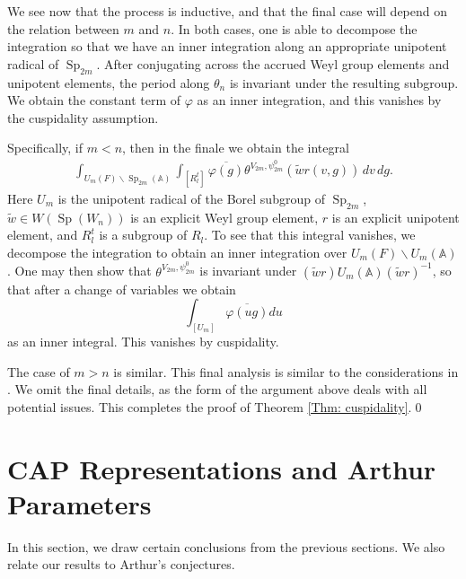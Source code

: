 \documentclass[11pt,reqno]{amsart}
\theoremstyle{definition}
\theoremstyle{remark}
\theoremstyle{definition}
\begin{document}
 We see now that the process is inductive, and that the final case will depend on the relation between $m$ and $n$. In both cases, one is able to decompose the integration so that we have an inner integration along an appropriate unipotent radical of $\operatorname{Sp}_{2m}$. After conjugating across the accrued Weyl group elements and unipotent elements, the period along $\theta_{n}$ is invariant under the resulting subgroup. We obtain the constant term of $\varphi$ as an inner integration, and this vanishes by the cuspidality assumption. 

Specifically, if $m<n$, then in the finale we obtain the integral
\begin{align}\label{eqn: m<n}
\int_{U_m(F)\backslash\operatorname{Sp}_{2m}({\mathbb A})}\int_{[R_l^t]}\overline{\varphi(g)}\theta^{V_{2m},\psi_{2m}^0}(\tilde{w}r(v,g))\,dv\,dg.
\end{align}
Here $U_m$ is the unipotent radical of the Borel subgroup of $\operatorname{Sp}_{2m}$, $\tilde{w}\in W(\operatorname{Sp}(W_n))$ is an explicit Weyl group element, $r$ is an explicit unipotent element, and $R_l^t$ is a subgroup of $R_l$. To see that this integral vanishes, we decompose the integration to obtain an inner integration over $U_m(F)\backslash U_m({\mathbb A})$. One may then show that $\theta^{V_{2m},\psi_{2m}^0}$ is invariant under $(\tilde{w}r)U_m({\mathbb A})(\tilde{w}r)^{-1}$, so that after a change of variables we obtain
\[
\int_{[U_m]}\overline{\varphi(ug)}du
\]
as an inner integral. This vanishes by cuspidality. 

The case of $m>n$ is similar. This final analysis is similar to the considerations in \cite{BFG2}. We omit the final details, as the form of the argument above deals with all potential issues. This completes the proof of Theorem \ref{Thm: cuspidality}.\qed

\section{CAP Representations and Arthur Parameters}\label{Section: CAP}
In this section, we draw certain conclusions from the previous sections. We also relate our results to Arthur's conjectures.
\end{document}
